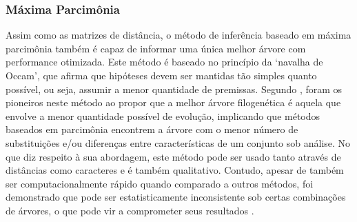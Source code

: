 \documentclass[english,brazilian]{UNISINOSmonografia} %
\begin{document}




\subsubsection{Máxima Parcimônia}


Assim como as matrizes de distância, o método de inferência baseado em máxima parcimônia também é capaz de informar uma única melhor árvore com performance otimizada.
Este método é baseado no princípio da \textquoteleft navalha de Occam\textquoteright, que afirma que hipóteses devem ser mantidas tão simples quanto possível, ou seja, assumir a menor quantidade de premissas.
Segundo ,  foram os pioneiros neste método ao propor que a melhor árvore filogenética é aquela que envolve a menor quantidade possível de evolução, implicando que métodos baseados em parcimônia encontrem a árvore com o menor número de substituições e/ou diferenças entre características de um conjunto sob análise.
No que diz respeito à sua abordagem, este método pode ser usado tanto através de distâncias como caracteres e é também qualitativo.
Contudo, apesar de também ser computacionalmente rápido quando comparado a outros métodos, foi demonstrado que pode ser estatisticamente inconsistente sob certas combinações de árvores, o que pode vir a comprometer seus resultados \cite{Felsenstein1978}.



\end{document}
